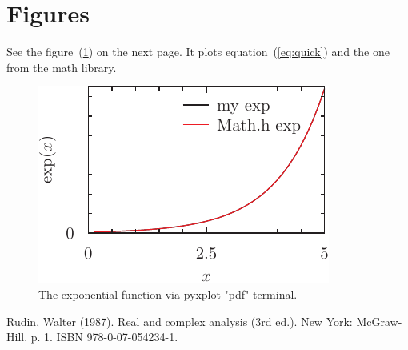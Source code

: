 \documentclass{article}
\begin{document}
\section{Figures}
See the figure~(\ref{fig:pyxplot}) on the next page. It plots equation~(\ref{eq:quick}) and the one from the math library.

\begin{figure}
    \centering
    \label{fig:pyxplot}
    \includegraphics{fig-pyxplot.pdf}
    \caption{The exponential function via pyxplot "pdf" terminal.}
\end{figure}

\begin{thebibliography}{9}
 Rudin, Walter (1987). Real and complex analysis (3rd ed.). New York: McGraw-Hill. p. 1. ISBN 978-0-07-054234-1.
\end{thebibliography}
\end{document}
